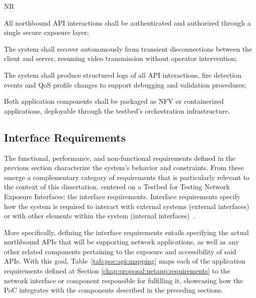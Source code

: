 \begin{custenumerate}{NR}
    \item All northbound \acs{API} interactions shall be authenticated and authorized through a single secure exposure layer;
    \item The system shall recover autonomously from transient disconnections between the client and server, resuming video transmission without operator intervention;
    \item The system shall produce structured logs of all \acs{API} interactions, fire detection events and \acs{QoS} profile changes to support debugging and validation procedures;
    \item Both application components shall be packaged as \acs{NFV} or containerized applications, deployable through the testbed's orchestration infrastructure.
\end{custenumerate}

\subsection{Interface Requirements}

The functional, performance, and non-functional requirements defined in the previous section characterize the system's behavior and constraints. From these emerge a complementary category of requirements that is particularly relevant to the context of this dissertation, centered on a Testbed for Testing Network Exposure Interfaces: the interface requirements. Interface requirements specify how the system is required to interact with external systems (external interfaces) or with other elements within the system (internal interfaces)~\cite{ISORequirementsEngineering}.

More specifically, defining the interface requirements entails specifying the actual northbound \acsp{API} that will be supporting network applications, as well as any other related components pertaining to the exposure and accessibility of said \acsp{API}. With this goal, Table~\ref{tab:poc:api:mapping} maps each of the application requirements defined at Section \ref{chap:proposal:netapp:requirements} to the network interface or component responsible for fulfilling it, showcasing how the \acs{PoC} integrates with the components described in the preceding sections.


